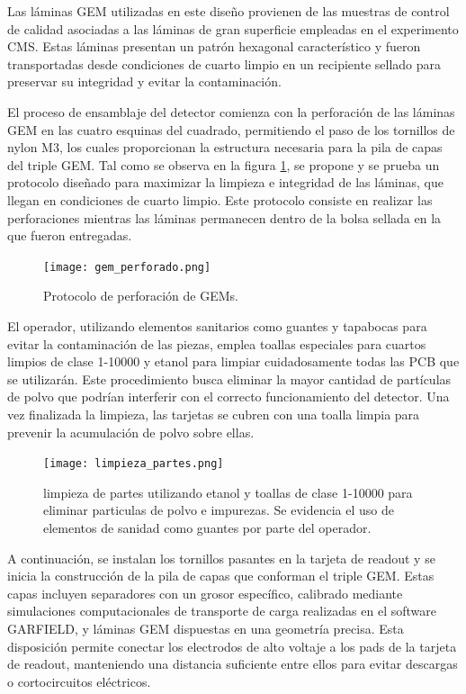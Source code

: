 \documentclass{article}
\begin{document}
\noindent Las láminas GEM utilizadas en este diseño provienen de las muestras de control de calidad asociadas a las láminas de gran superficie empleadas en el experimento CMS. Estas láminas presentan un patrón hexagonal característico y fueron transportadas desde condiciones de cuarto limpio en un recipiente sellado para preservar su integridad y evitar la contaminación.

\noindent El proceso de ensamblaje del detector comienza con la perforación de las láminas GEM en las cuatro esquinas del cuadrado, permitiendo el paso de los tornillos de nylon M3, los cuales proporcionan la estructura necesaria para la pila de capas del triple GEM. Tal como se observa en la figura \ref{fig:gem_perforado}, se propone y se prueba un protocolo diseñado para maximizar la limpieza e integridad de las láminas, que llegan en condiciones de cuarto limpio. Este protocolo consiste en realizar las perforaciones mientras las láminas permanecen dentro de la bolsa sellada en la que fueron entregadas.

\begin{figure}[H]
    \centering
    \texttt{[image: gem\_perforado.png]}
    \caption{Protocolo de perforación de GEMs.}
    \label{fig:gem_perforado}
\end{figure}

\noindent El operador, utilizando elementos sanitarios como guantes y tapabocas para evitar la contaminación de las piezas, emplea toallas especiales para cuartos limpios de clase 1-10000 y etanol para limpiar cuidadosamente todas las PCB que se utilizarán. Este procedimiento busca eliminar la mayor cantidad de partículas de polvo que podrían interferir con el correcto funcionamiento del detector. Una vez finalizada la limpieza, las tarjetas se cubren con una toalla limpia para prevenir la acumulación de polvo sobre ellas.

\begin{figure}[H]
    \centering
    \texttt{[image: limpieza\_partes.png]}
    \caption{limpieza de partes utilizando etanol y toallas de clase 1-10000 para eliminar particulas de polvo e impurezas. Se evidencia el uso de elementos de sanidad como guantes por parte del operador.}
    \label{fig:limpieza}
\end{figure}

\noindent A continuación, se instalan los tornillos pasantes en la tarjeta de readout y se inicia la construcción de la pila de capas que conforman el triple GEM. Estas capas incluyen separadores con un grosor específico, calibrado mediante simulaciones computacionales de transporte de carga realizadas en el software GARFIELD, y láminas GEM dispuestas en una geometría precisa. Esta disposición permite conectar los electrodos de alto voltaje a los pads de la tarjeta de readout, manteniendo una distancia suficiente entre ellos para evitar descargas o cortocircuitos eléctricos.
\end{document}
